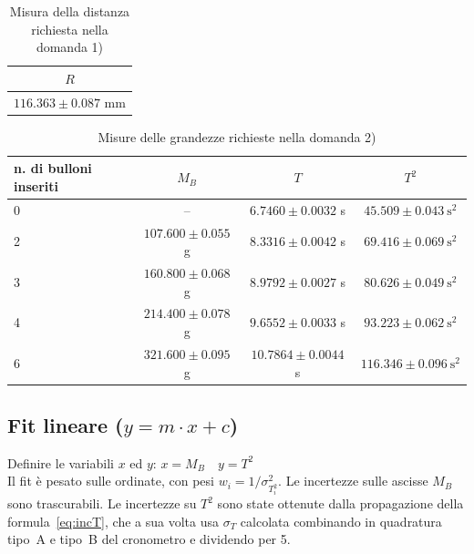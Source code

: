 \documentclass{article}
\begin{document}
\newpage

{\def\arraystretch{2}\tabcolsep=12pt
	\begin{table}[h!]
		\begin{center}
			\begin{tabular}{|c|}
				\hline
				$R $ \\
				\hline  
				$116.363 \pm 0.087$ mm \\
				\hline
			\end{tabular}
		\end{center}
		\caption{Misura della distanza richiesta nella domanda 1)}
		\label{tab2}
	\end{table}
}

{\def\arraystretch{2}\tabcolsep=12pt
	\begin{table}[h!]
		\begin{center}
			\begin{tabular}{|l|c|c|c|}
				\hline
				n. di bulloni inseriti & $M_B$ & $T$ &  $T^2$  \\
				\hline
				0 & --                    & $6.7460 \pm 0.0032$ s & $45.509 \pm 0.043\ \mathrm{s}^2$\\
				\hline
				2 & $107.600 \pm 0.055$ g & $8.3316 \pm 0.0042$ s & $69.416 \pm 0.069\ \mathrm{s}^2$ \\
				\hline
				3 & $160.800 \pm 0.068$ g & $8.9792 \pm 0.0027$ s & $80.626 \pm 0.049\ \mathrm{s}^2$ \\
				\hline
				4 & $214.400 \pm 0.078$ g & $9.6552 \pm 0.0033$ s & $93.223 \pm 0.062\ \mathrm{s}^2$ \\
				\hline
				6 & $321.600 \pm 0.095$ g & $10.7864 \pm 0.0044$ s & $116.346 \pm 0.096\ \mathrm{s}^2$ \\
				\hline
			\end{tabular}
		\end{center}
		\caption{Misure delle grandezze richieste nella domanda 2)}
		\label{tab3}
	\end{table}
}
\newpage

\subsection{Fit lineare ($y=m \cdot x + c$)}

Definire le variabili $x$ ed $y$: $x = M_B \quad y = T^2$ \\

Il fit è pesato sulle ordinate, con pesi $w_i = 1/\sigma_{T_i^2}^2$.
Le incertezze sulle ascisse $M_B$ sono trascurabili.
Le incertezze su $T^2$ sono state ottenute dalla propagazione della formula~\ref{eq:incT},
che a sua volta usa $\sigma_T$ calcolata combinando in quadratura tipo~A e tipo~B
del cronometro e dividendo per 5.
\end{document}
